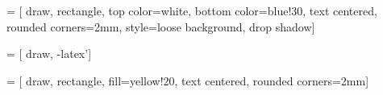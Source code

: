 
 = [
draw,
rectangle,
top color=white,
bottom color=blue!30,
text centered,
rounded corners=2mm,
style=loose background,
drop shadow]

 = [
draw,
-latex']

 = [
draw,
rectangle,
fill=yellow!20,
text centered,
rounded corners=2mm]

